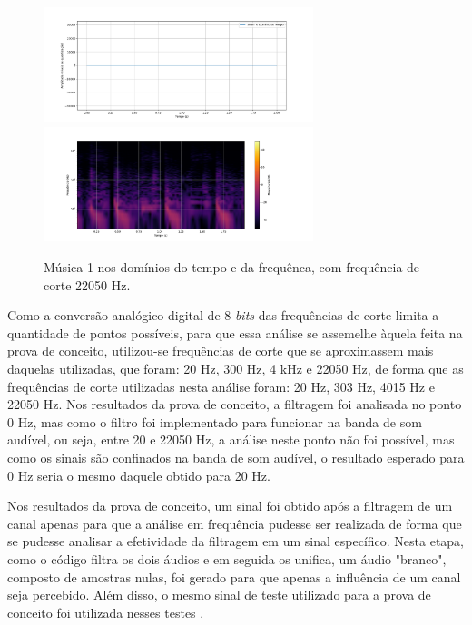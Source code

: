 \begin{figure}[htpb]
    \centering
    \includegraphics[width=0.7\textwidth]{figuras/fig87.png}
    \includegraphics[width=0.7\textwidth]{figuras/fig88.png}
    \caption{Música 1 nos domínios do tempo e da frequênca, com frequência de corte 22050 Hz.}
    \label{fig87}
\end{figure}

Como a conversão analógico digital de 8 \textit{bits} das frequências de corte limita a quantidade de pontos possíveis, para que essa análise se assemelhe àquela feita na prova de conceito, utilizou-se frequências de corte que se aproximassem mais daquelas utilizadas, que foram: 20 Hz, 300 Hz, 4 kHz e 22050 Hz, de forma que as frequências de corte utilizadas nesta análise foram: 20 Hz, 303 Hz, 4015 Hz e 22050 Hz. Nos resultados da prova de conceito, a filtragem foi analisada no ponto 0 Hz, mas como o filtro foi implementado para funcionar na banda de som audível, ou seja, entre 20 e 22050 Hz, a análise neste ponto não foi possível, mas como os sinais são confinados na banda de som audível, o resultado esperado para 0 Hz seria o mesmo daquele obtido para 20 Hz. 

Nos resultados da prova de conceito, um sinal foi obtido após a filtragem de um canal apenas para que a análise em frequência pudesse ser realizada de forma que se pudesse analisar a efetividade da filtragem em um sinal específico. Nesta etapa, como o código filtra os dois áudios e em seguida os unifica, um áudio "branco", composto de amostras nulas, foi gerado para que apenas a influência de um canal seja percebido. 
Além disso, o mesmo sinal de teste utilizado para a prova de conceito foi utilizada nesses testes \cite{track01}.

